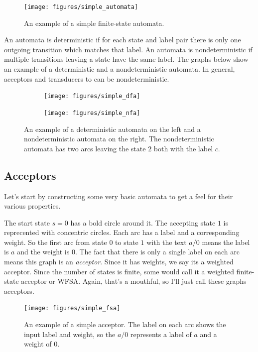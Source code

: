 \documentclass[main.tex]{subfiles}
\begin{document}
\begin{figure}
    \centering
    \texttt{[image: figures/simple\_automata]}
    \caption{An example of a simple finite-state automata.}
    \label{fig:simple_automata}
 \end{figure}

An automata is deterministic if for each state and label pair there is only one
outgoing transition which matches that label. An automata is nondeterministic
if multiple transitions leaving a state have the same label. The graphs below
show an example of a deterministic and a nondeterministic automata. In general,
acceptors and transducers to can be nondeterministic.

\begin{figure}
    \centering
    \begin{subfigure}[b]{0.48\textwidth}
        \texttt{[image: figures/simple\_dfa]}
    \end{subfigure}
    \begin{subfigure}[b]{0.48\textwidth}
        \texttt{[image: figures/simple\_nfa]}
    \end{subfigure}
    \caption{An example of a deterministic automata on the left and a
    nondeterministic automata on the right. The nondeterministic automata has
    two arcs leaving the state $2$ both with the label $c$.}
    \label{fig:dfa_nfa}
\end{figure}

\subsection{Acceptors}

Let's start by constructing some very basic automata to get a feel for their
various properties.

The start state $s = 0$ has a bold circle around it. The accepting state $1$ is
reprecented with concentric circles. Each arc has a label and a corresponding
weight. So the first arc from state $0$ to state $1$ with the text $a/0$ means
the label is $a$ and the weight is $0$. The fact that there is only a single
label on each arc means this graph is an \emph{acceptor}. Since it has weights,
we say its a weighted acceptor. Since the number of states is finite, some
would call it a weighted finite-state acceptor or WFSA. Again, that's a
mouthful, so I'll just call these graphs acceptors.

\begin{figure}
    \centering
    \texttt{[image: figures/simple\_fsa]}
    \caption{An example of a simple acceptor. The label on each arc shows the
    input label and weight, so the $a/0$ represents a label of $a$ and a weight
    of $0$.}
    \label{fig:simple_fsa}
\end{figure}
\end{document}
